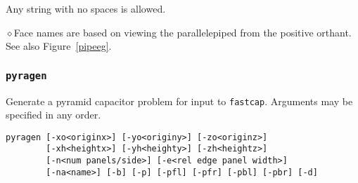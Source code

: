 \noindent\ddag Any string with no spaces is allowed.

\noindent $\diamond $Face names are based on viewing the parallelepiped
from the positive orthant. See also Figure~\ref{pipeeg}.



\subsubsection*{\tt pyragen}

Generate a pyramid capacitor problem for input to {\tt fastcap}. Arguments
may be specified in any order.
\begin{verbatim}
pyragen [-xo<originx>] [-yo<originy>] [-zo<originz>]
        [-xh<heightx>] [-yh<heighty>] [-zh<heightz>]
        [-n<num panels/side>] [-e<rel edge panel width>]
        [-na<name>] [-b] [-p] [-pfl] [-pfr] [-pbl] [-pbr] [-d]
\end{verbatim}

